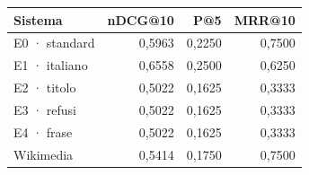 \begin{center}\begin{tabular}{lrrr}\toprule
Sistema & nDCG@10 & P@5 & MRR@10 \\\midrule
E0 · standard & 0,5963 & 0,2250 & 0,7500 \\
E1 · italiano & 0,6558 & 0,2500 & 0,6250 \\
E2 · titolo & 0,5022 & 0,1625 & 0,3333 \\
E3 · refusi & 0,5022 & 0,1625 & 0,3333 \\
E4 · frase & 0,5022 & 0,1625 & 0,3333 \\
Wikimedia & 0,5414 & 0,1750 & 0,7500 \\
\bottomrule\end{tabular}\end{center}
